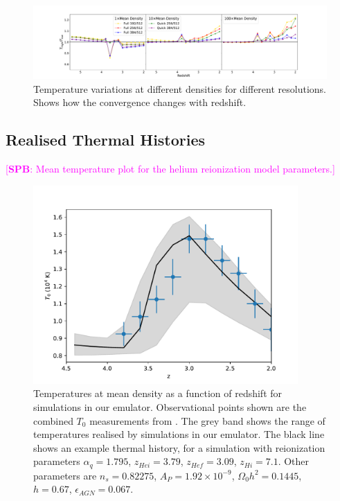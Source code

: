 \documentclass[a4paper,11pt]{article}
\newcommand{\spb}[1]{{\textcolor{magenta}{[{\bf SPB}: #1]}}}
\begin{document}
\begin{figure}
\includegraphics[width=1.\textwidth]{figures/comp-temps_fq.pdf}
 \caption{Temperature variations at different densities for different resolutions. Shows how the convergence changes with redshift.}
 \label{fig:resolutiontemp}
\end{figure}

\subsection{Realised Thermal Histories}
\spb{Mean temperature plot for the helium reionization model parameters.}

\begin{figure}
\includegraphics[width=0.9\textwidth]{figures/mean-temperature.pdf}
 \caption{Temperatures at mean density as a function of redshift for simulations in our emulator. Observational points shown are the combined $T_0$ measurements from \protect\cite{Gaikwad:2021}.  The grey band shows the range of temperatures realised by simulations in our emulator. The black line shows an example thermal history, for a simulation with reionization parameters $\alpha_q = 1.795$, $z_{Hei} = 3.79$, $z_{Hef} = 3.09$, $z_{Hi} = 7.1$. Other parameters are $n_s = 0.82275$, $A_P = 1.92 \times 10^{-9}$, $\Omega_0 h^2 = 0.1445$, $h = 0.67$, $\epsilon_{AGN} = 0.067$.
}
 \label{fig:heliumtempdens}
\end{figure}
\end{document}
